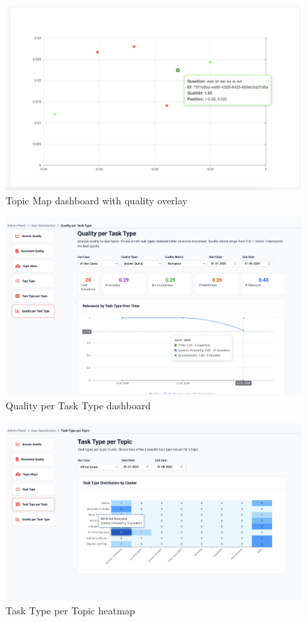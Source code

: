 \documentclass[
	english,
	ruledheaders=section,%
	class=report,%
	thesis={type=bachelor},%
	accentcolor=1b,%
	custommargins=true,%
	marginpar=false,%
	parskip=half-,%
	fontsize=11pt,%
	DIV=14,
]{tudapub}
\begin{document}
\begin{figure}[h!]
    \centering
    \includegraphics[width=0.75\linewidth]{images/TopicMapsQuality.png}
    \captionsetup{list=no}
    \caption{Topic Map dashboard with quality overlay}
    \label{fig:topic_maps_quality}
\end{figure}

\begin{figure}[h!]
    \centering
    \includegraphics[width=0.75\linewidth]{images/QualityPerTaskType.png}
    \captionsetup{list=no}
    \caption{Quality per Task Type dashboard}
    \label{fig:quality_per_task_type}
\end{figure}

\begin{figure}[h!]
    \centering
    \includegraphics[width=0.75\linewidth]{images/TaskTypePerTopic.png}
    \captionsetup{list=no}
    \caption{Task Type per Topic heatmap}
    \label{fig:task_type_per_topic}
\end{figure}
\end{document}

